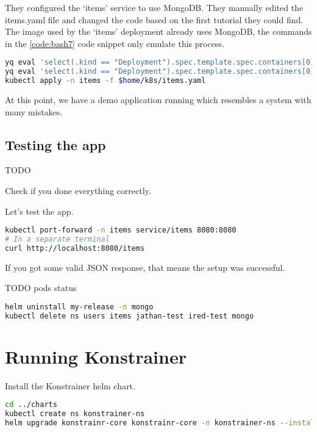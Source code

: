 They configured the `items' service to use MongoDB. They manually edited the items.yaml file and changed the code based on the first tutorial they could find. The image used by the `items' deployment already uses MongoDB, the commands in the \ref{code:bash7} code snippet only emulate this process.

\begin{lstlisting}[caption={Configure the `items' app to use MongoDB},language=bash,label=code:bash7]
yq eval 'select(.kind == "Deployment").spec.template.spec.containers[0].env[0].value = env(MONGODB_ROOT_PASSWORD)' $home/k8s/items.yaml -i
yq eval 'select(.kind == "Deployment").spec.template.spec.containers[0].env[1].value = env(MONGO_HOST)' $home/k8s/items.yaml -i
kubectl apply -n items -f $home/k8s/items.yaml
\end{lstlisting}

At this point, we have a demo application running which resembles a system with many mistakes.

\subsection{Testing the app}

TODO

Check if you done everything correctly.

Let's test the app.

\begin{lstlisting}[caption={TODO},language=bash,label=code:bash8]
kubectl port-forward -n items service/items 8080:8080
# In a separate terminal
curl http://localhost:8080/items
\end{lstlisting}

If you got some valid JSON response, that means the setup was successful.

TODO pods status

\begin{lstlisting}[caption={Teardown},language=bash,label=code:bash9]
helm uninstall my-release -n mongo
kubectl delete ns users items jathan-test ired-test mongo
\end{lstlisting}

\section{Running Konstrainer}

Install the Konstrainer helm chart.

\begin{lstlisting}[caption={TODO},language=bash,label=code:bashx]
cd ../charts
kubectl create ns konstrainer-ns
helm upgrade konstrainr-core konstrainr-core -n konstrainer-ns --install
\end{lstlisting}

